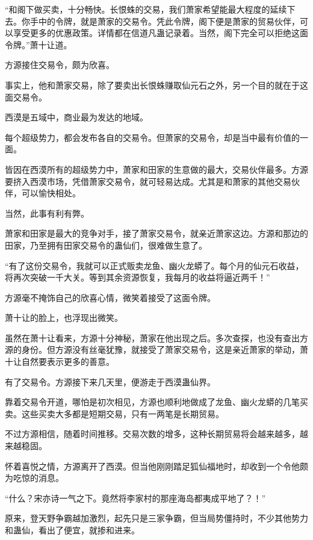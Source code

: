
\begin{this_body}



“和阁下做买卖，十分畅快。长恨蛛的交易，我们萧家希望能最大程度的延续下去。你手中的令牌，就是萧家的交易令。凭此令牌，阁下便是萧家的贸易伙伴，可以享受更多的优惠政策。详情都在信道凡蛊记录着。当然，阁下完全可以拒绝这面令牌。”萧十让道。

方源接住交易令，颇为欣喜。

事实上，他和萧家交易，除了要卖出长恨蛛赚取仙元石之外，另一个目的就在于这面交易令。

西漠是五域中，商业最为发达的地域。

每个超级势力，都会发布各自的交易令。但萧家的交易令，却是当中最有价值的一面。

皆因在西漠所有的超级势力中，萧家和田家的生意做的最大，交易伙伴最多。方源要挤入西漠市场，凭借萧家交易令，就可轻易达成。尤其是和萧家的其他交易伙伴，可以愉快相处。

当然，此事有利有弊。

萧家和田家是最大的竞争对手，接了萧家交易令，就亲近萧家这边。方源和那边的田家，乃至拥有田家交易令的蛊仙们，很难做生意了。

“有了这份交易令，我就可以正式贩卖龙鱼、幽火龙蟒了。每个月的仙元石收益，将再次突破一千大关。等到其余资源恢复，我每月的收益将逼近两千！”

方源毫不掩饰自己的欣喜心情，微笑着接受了这面令牌。

萧十让的脸上，也浮现出微笑。

虽然在萧十让看来，方源十分神秘，萧家在他出现之后。多次查探，也没有查出方源的身份。但方源没有丝毫犹豫，就接受了萧家交易令，这是亲近萧家的举动，萧十让自然要表示更多的善意。

有了交易令。方源接下来几天里，便游走于西漠蛊仙界。

靠着交易令开道，哪怕是初次相见，方源也顺利地做成了龙鱼、幽火龙蟒的几笔买卖。这些买卖大多都是短期交易，只有一两笔是长期贸易。

不过方源相信，随着时间推移。交易次数的增多，这种长期贸易将会越来越多，越来越稳固。

怀着喜悦之情，方源离开了西漠。但当他刚刚踏足狐仙福地时，却收到一个令他颇为吃惊的消息。

“什么？宋亦诗一气之下。竟然将李家村的那座海岛都夷成平地了？！”

原来，登天野争霸越加激烈，起先只是三家争霸，但当局势僵持时，不少其他势力和蛊仙，看出了便宜，就掺和进来。


\end{this_body}
